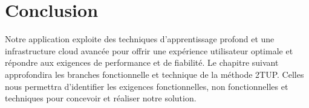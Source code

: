 \section*{Conclusion}
\justifying
Notre application exploite des techniques d'apprentissage profond et une infrastructure cloud avancée pour offrir une expérience utilisateur optimale et répondre aux exigences de performance et de fiabilité. Le chapitre suivant approfondira les branches fonctionnelle et technique de la méthode 2TUP. Celles nous permettra d’identifier les exigences fonctionnelles, non fonctionnelles et techniques pour concevoir et réaliser notre solution.

